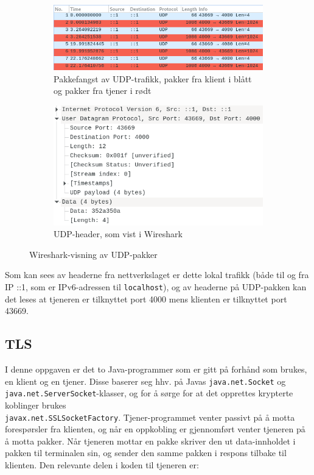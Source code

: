 \documentclass{article}
\newcommand{\code}[1]{\colorbox{light-gray}{\texttt{#1}}}
\begin{document}
\begin{figure}[h]
    \centering
    \begin{subfigure}{.45\linewidth}
        \centering
        \includegraphics[width=\linewidth]{illustrasjoner/P4-UDP-capture.png}
        \caption[short]{Pakkefangst av UDP-trafikk, pakker fra klient i blått og pakker fra tjener i rødt}
    \end{subfigure}
    \hfill
    \begin{subfigure}{.45\linewidth}
        \centering
        \includegraphics[width=\linewidth]{illustrasjoner/P4-UDP-header.png}
        \caption[short]{UDP-header, som vist i Wireshark}
    \end{subfigure}
    \caption{Wireshark-visning av UDP-pakker}
\end{figure}

Som kan sees av headerne fra nettverkslaget er dette lokal trafikk (både til og fra IP ::1, som er IPv6-adressen til \texttt{localhost}), og av headerne på UDP-pakken kan det leses at tjeneren er tilknyttet port 4000 mens klienten er tilknyttet port 43669.

\subsection{TLS}

I denne oppgaven er det to Java-programmer som er gitt på forhånd som brukes, en klient og en tjener. Disse baserer seg hhv. på Javas \code{java.net.Socket} og \code{java.net.ServerSocket}-klasser, og for å sørge for at det opprettes krypterte koblinger brukes \\ \code{javax.net.SSLSocketFactory}. Tjener-programmet venter passivt på å motta forespørsler fra klienten, og når en oppkobling er gjennomført venter tjeneren på å motta pakker.
Når tjeneren mottar en pakke skriver den ut data-innholdet i pakken til terminalen sin, og sender den samme pakken i respons tilbake til klienten. Den relevante delen i koden til tjeneren er:
\end{document}
